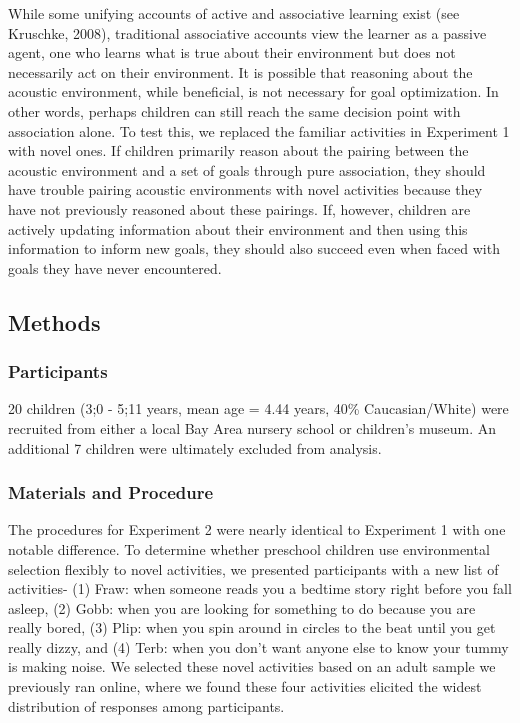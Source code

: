 \documentclass[10pt, letterpaper]{article}
\begin{document}
While some unifying accounts of active and associative learning exist
(see Kruschke, 2008), traditional associative accounts view the learner
as a passive agent, one who learns what is true about their environment
but does not necessarily act on their environment. It is possible that
reasoning about the acoustic environment, while beneficial, is not
necessary for goal optimization. In other words, perhaps children can
still reach the same decision point with association alone. To test
this, we replaced the familiar activities in Experiment 1 with novel
ones. If children primarily reason about the pairing between the
acoustic environment and a set of goals through pure association, they
should have trouble pairing acoustic environments with novel activities
because they have not previously reasoned about these pairings. If,
however, children are actively updating information about their
environment and then using this information to inform new goals, they
should also succeed even when faced with goals they have never
encountered.

\hypertarget{methods-1}{%
\subsection{Methods}\label{methods-1}}

\hypertarget{participants-1}{%
\subsubsection{Participants}\label{participants-1}}

20 children (3;0 - 5;11 years, mean age = 4.44 years, 40\%
Caucasian/White) were recruited from either a local Bay Area nursery
school or children's museum. An additional 7 children were ultimately
excluded from analysis.

\hypertarget{materials-and-procedure-1}{%
\subsubsection{Materials and
Procedure}\label{materials-and-procedure-1}}

The procedures for Experiment 2 were nearly identical to Experiment 1
with one notable difference. To determine whether preschool children use
environmental selection flexibly to novel activities, we presented
participants with a new list of activities- (1) Fraw: when someone reads
you a bedtime story right before you fall asleep, (2) Gobb: when you are
looking for something to do because you are really bored, (3) Plip: when
you spin around in circles to the beat until you get really dizzy, and
(4) Terb: when you don't want anyone else to know your tummy is making
noise. We selected these novel activities based on an adult sample we
previously ran online, where we found these four activities elicited the
widest distribution of responses among participants.
\end{document}
